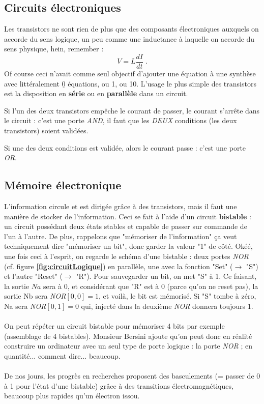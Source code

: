 \documentclass[12pt,a4paper]{report}
\begin{document}
\subsection{Circuits électroniques}
Les transistors ne sont rien de plus que des composants électroniques auxquels on accorde du sens logique, un peu comme une inductance à laquelle on accorde du sens physique, hein, remember : $$ V = L \dfrac{dI}{dt} \; .$$ Of course ceci n'avait comme seul objectif d'ajouter une équation à une synthèse avec littéralement $\underline{0}$ équations, ou 1, ou 10. L'usage le plus simple des transistors est la disposition en \textbf{série} ou en \textbf{parallèle} dans un circuit.
\begin{description}[leftmargin = !, labelwidth = \widthof{\bfseries Parall. : }]
\item[Série : ] Si l'un des deux transistors empêche le courant de passer, le courant s'arrête dans le circuit : c'est une porte \textit{AND}, il faut que les \textit{DEUX} conditions (les deux transistors) soient validées.
\item[Parall. : ] Si une des deux conditions est validée, alors le courant passe : c'est une porte \textit{OR}.
\end{description}
\subsection{Mémoire électronique}
L'information circule et est dirigée grâce à des transistors, mais il faut une manière de stocker de l'information. Ceci se fait à l'aide d'un circuit \textbf{bistable} : un circuit possédant deux états stables et capable de passer sur commande de l'un à l'autre. De plus, rappelons que "mémoriser de l'information" ça veut techniquement dire "mémoriser un bit", donc garder la valeur "1" de côté. Okéé, une fois ceci à l'esprit, on regarde le schéma d'une bistable : deux portes \textit{NOR} (cf. figure \textbf{\ref{fig:circuitLogique}}) en parallèle, une avec la fonction "Set" ($\rightarrow$ "S") et l'autre "Reset" ($\rightarrow$ "R"). Pour sauvegarder un bit, on met "S" à 1. Ce faisant, la sortie $Na$ sera à 0, et considérant que "R" est à 0 (parce qu'on ne reset pas), la sortie Nb sera \textit{NOR}$[0,0] = 1$, et voilà, le bit est mémorisé. Si "S" tombe à zéro, Na sera \textit{NOR}$[0,1] =0$ qui, injecté dans la deuxième \textit{NOR} donnera toujours 1.\\
\\
On peut répéter un circuit bistable pour mémoriser 4 bits par exemple (assemblage de 4 bistables). Monsieur Bersini ajoute qu'on peut donc en réalité construire un ordinateur avec un seul type de porte logique : la porte \textit{NOR} ; en quantité... comment dire... beaucoup. \\
\\
De nos jours, les progrès en recherches proposent des basculements (= passer de 0 à 1 pour l'état d'une bistable) grâce à des transitions électromagnétiques, beaucoup plus rapides qu'un électron issou.
\end{document}
